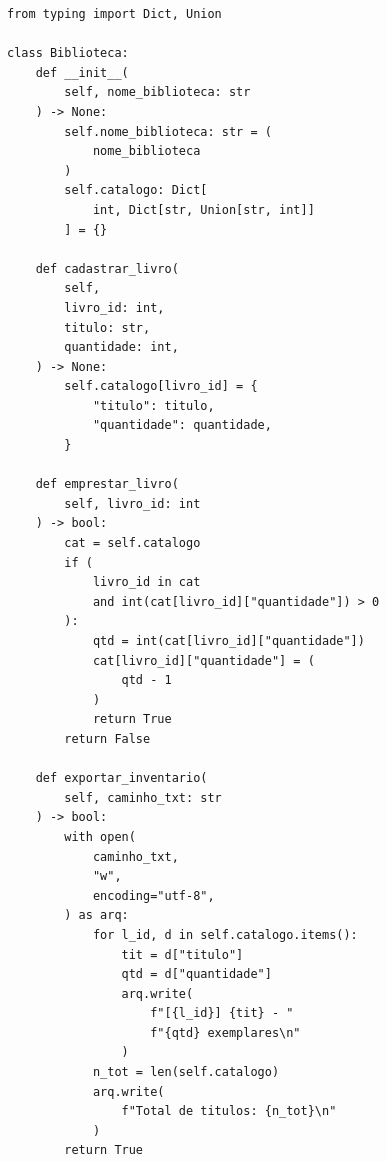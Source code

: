\ifmostrarGabarito
\begin{verbatim}
from typing import Dict, Union

class Biblioteca:
    def __init__(
        self, nome_biblioteca: str
    ) -> None:
        self.nome_biblioteca: str = (
            nome_biblioteca
        )
        self.catalogo: Dict[
            int, Dict[str, Union[str, int]]
        ] = {}

    def cadastrar_livro(
        self,
        livro_id: int,
        titulo: str,
        quantidade: int,
    ) -> None:
        self.catalogo[livro_id] = {
            "titulo": titulo,
            "quantidade": quantidade,
        }

    def emprestar_livro(
        self, livro_id: int
    ) -> bool:
        cat = self.catalogo
        if (
            livro_id in cat
            and int(cat[livro_id]["quantidade"]) > 0
        ):
            qtd = int(cat[livro_id]["quantidade"])
            cat[livro_id]["quantidade"] = (
                qtd - 1
            )
            return True
        return False

    def exportar_inventario(
        self, caminho_txt: str
    ) -> bool:
        with open(
            caminho_txt,
            "w",
            encoding="utf-8",
        ) as arq:
            for l_id, d in self.catalogo.items():
                tit = d["titulo"]
                qtd = d["quantidade"]
                arq.write(
                    f"[{l_id}] {tit} - "
                    f"{qtd} exemplares\n"
                )
            n_tot = len(self.catalogo)
            arq.write(
                f"Total de titulos: {n_tot}\n"
            )
        return True
\end{verbatim}

\fi
